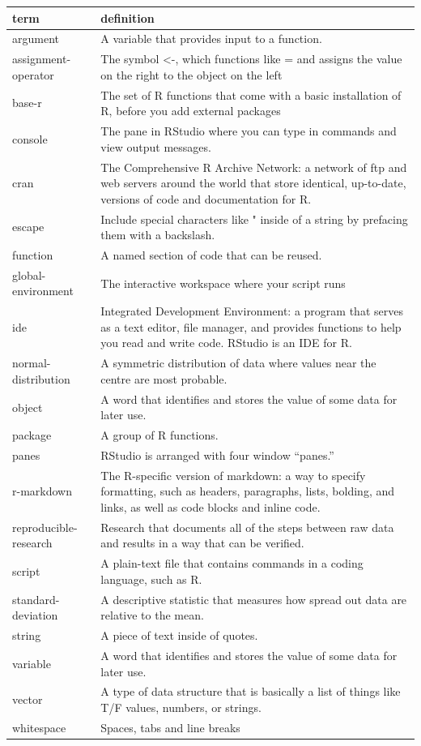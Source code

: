 \documentclass[
  oneside]{book}
\begin{document}
\begin{tabular}{l|l}
\hline
term & definition\\
\hline
argument & A variable that provides input to a function.\\
\hline
assignment-operator & The symbol <-, which functions like = and assigns the value on the right to the object on the left\\
\hline
base-r & The set of R functions that come with a basic installation of R, before you add external packages\\
\hline
console & The pane in RStudio where you can type in commands and view output messages.\\
\hline
cran & The Comprehensive R Archive Network: a network of ftp and web servers around the world that store identical, up-to-date, versions of code and documentation for R.\\
\hline
escape & Include special characters like " inside of a string by prefacing them with a backslash.\\
\hline
function & A named section of code that can be reused.\\
\hline
global-environment & The interactive workspace where your script runs\\
\hline
ide & Integrated Development Environment: a program that serves as a text editor, file manager, and provides functions to help you read and write code. RStudio is an IDE for R.\\
\hline
normal-distribution & A symmetric distribution of data where values near the centre are most probable.\\
\hline
object & A word that identifies and stores the value of some data for later use.\\
\hline
package & A group of R functions.\\
\hline
panes & RStudio is arranged with four window “panes.”\\
\hline
r-markdown & The R-specific version of markdown: a way to specify formatting, such as headers, paragraphs, lists, bolding, and links, as well as code blocks and inline code.\\
\hline
reproducible-research & Research that documents all of the steps between raw data and results in a way that can be verified.\\
\hline
script & A plain-text file that contains commands in a coding language, such as R.\\
\hline
standard-deviation & A descriptive statistic that measures how spread out data are relative to the mean.\\
\hline
string & A piece of text inside of quotes.\\
\hline
variable & A word that identifies and stores the value of some data for later use.\\
\hline
vector & A type of data structure that is basically a list of things like T/F values, numbers, or strings.\\
\hline
whitespace & Spaces, tabs and line breaks\\
\hline
\end{tabular}
\end{document}
